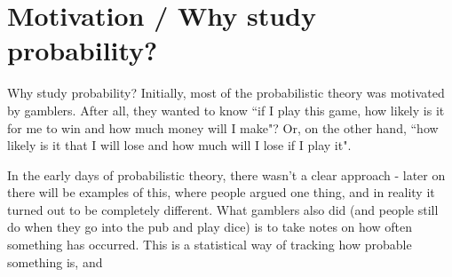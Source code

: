 \section{Motivation / Why study probability?} 

Why study probability? Initially, most of the probabilistic theory was motivated by gamblers. After all, they wanted to know ``if I play this game, how likely is it for me to win and how much money will I make"? Or, on the other hand, ``how likely is it that I will lose and how much will I lose if I play it". 

In the early days of probabilistic theory, there wasn't a clear approach - later on there will be examples of this, where people argued one thing, and in reality it turned out to be completely different. What gamblers also did (and people still do when they go into the pub and play dice) is to take notes on how often something has occurred. This is a statistical way of tracking how probable something is, and 